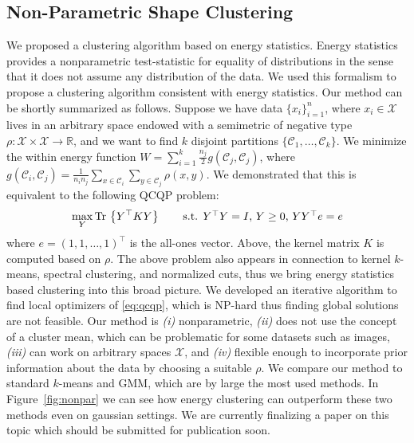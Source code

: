 \documentclass[simplex.tex]{subfiles}
\begin{document}
\subsection{Non-Parametric Shape Clustering}

We proposed a clustering algorithm based on energy statistics.
Energy statistics provides a nonparametric test-statistic  for equality
of distributions in the sense that 
it does not assume any distribution of the data. We used this formalism to
propose a clustering algorithm consistent with energy statistics.
Our method can be shortly summarized as follows. Suppose we have
data $\{ x_i \}_{i=1}^{n}$, where $x_i \in \mathcal{X}$ lives in
an arbitrary space endowed with a semimetric of negative type
$\rho : \mathcal{X} \times \mathcal{X} \to \mathbb{R}$, 
and we want to find $k$ disjoint partitions
$\{ \mathcal{C}_1, \dotsc, \mathcal{C}_k \}$.
We minimize the within energy function
$W = \sum_{i=1}^k \tfrac{n_j}{2} g(\mathcal{C}_j, \mathcal{C}_j)$,
where $g(\mathcal{C}_i, \mathcal{C}_j) = \tfrac{1}{n_i n_j} \sum_{x\in
\mathcal{C}_i}\sum_{y\in\mathcal{C}_j} \rho(x,y)$. We demonstrated that this
is equivalent to the following QCQP problem:
\begin{equation}
\label{eq:qcqp}
\max_Y \textnormal{Tr} \, 
\left\{ Y^\top K Y \right\} \qquad \mbox{s.t. $Y^\top Y = I$, 
$Y\ge 0$, $Y Y^\top e = e$}
\end{equation}
where $e=(1,1,\dotsc,1)^\top$ is the all-ones vector. Above, the kernel
matrix $K$ is computed based on $\rho$. The above problem also appears
in connection to kernel $k$-means, spectral clustering, and normalized cuts,
thus we bring energy statistics based clustering into this broad picture.
We developed an iterative algorithm
to find local optimizers of \ref{eq:qcqp}, which is NP-hard thus finding
global
solutions are not feasible. Our method is \emph{(i)} nonparametric, 
\emph{(ii)} does not use the
concept of a cluster mean, which can be problematic for some datasets such as
images, \emph{(iii)} can work on arbitrary 
spaces $\mathcal{X}$, and \emph{(iv)} flexible enough to
incorporate prior information about the data by choosing a suitable
$\rho$. We compare our method to standard $k$-means and GMM, which are 
by large the most used methods. In
Figure~\ref{fig:nonpar} we can see how energy clustering can outperform
these two methods even on gaussian settings.
We are currently finalizing a paper on this topic which should be submitted
for publication soon.
\end{document}
